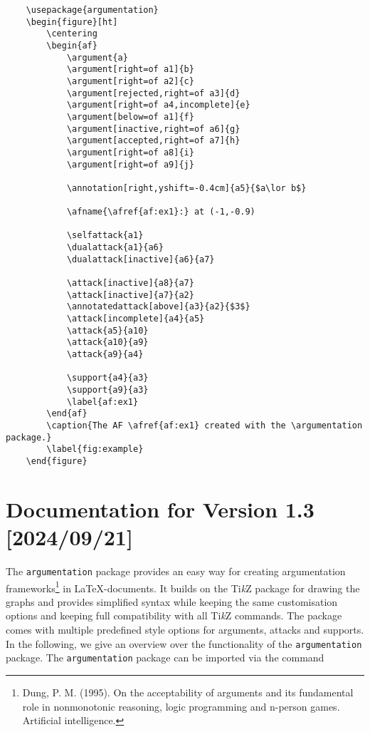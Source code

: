 \documentclass[headings=normal]{scrartcl}
\newcommand{\tikzname}{Ti\emph{k}Z\xspace}
\newcommand{\argumentation}{\texttt{argumentation}\xspace}
\begin{document}
\hspace{-1.2cm}
\begin{minipage}[c]{0.99\textwidth}
\begin{verbatim}
    \usepackage{argumentation}
    \begin{figure}[ht]
        \centering
        \begin{af}
            \argument{a}
            \argument[right=of a1]{b}
            \argument[right=of a2]{c}
            \argument[rejected,right=of a3]{d}
            \argument[right=of a4,incomplete]{e}
            \argument[below=of a1]{f}
            \argument[inactive,right=of a6]{g}
            \argument[accepted,right=of a7]{h}
            \argument[right=of a8]{i}
            \argument[right=of a9]{j}
    
            \annotation[right,yshift=-0.4cm]{a5}{$a\lor b$}
    
            \afname{\afref{af:ex1}:} at (-1,-0.9)
    
            \selfattack{a1}
            \dualattack{a1}{a6}
            \dualattack[inactive]{a6}{a7}
            
            \attack[inactive]{a8}{a7}
            \attack[inactive]{a7}{a2}
            \annotatedattack[above]{a3}{a2}{$3$}
            \attack[incomplete]{a4}{a5}
            \attack{a5}{a10}
            \attack{a10}{a9}
            \attack{a9}{a4}
    
            \support{a4}{a3}
            \support{a9}{a3}
            \label{af:ex1}
        \end{af}
        \caption{The AF \afref{af:ex1} created with the \argumentation package.}
        \label{fig:example}
    \end{figure}
\end{verbatim}
\end{minipage}

\newpage\section{Documentation for Version 1.3 [2024/09/21]}\label{sec:documentation}

The \argumentation package provides an easy way for creating argumentation frameworks\footnote{Dung, P. M. (1995). On the acceptability of arguments and its fundamental role in nonmonotonic reasoning, logic programming and n-person games. Artificial intelligence.} in \LaTeX-documents.
It builds on the \tikzname package for drawing the graphs and provides simplified syntax while keeping the same customisation options and keeping full compatibility with all \tikzname commands.
The package comes with multiple predefined style options for arguments, attacks and supports.
In the following, we give an overview over the functionality of the \argumentation package.
The \argumentation package can be imported via the command
    
\end{document}
